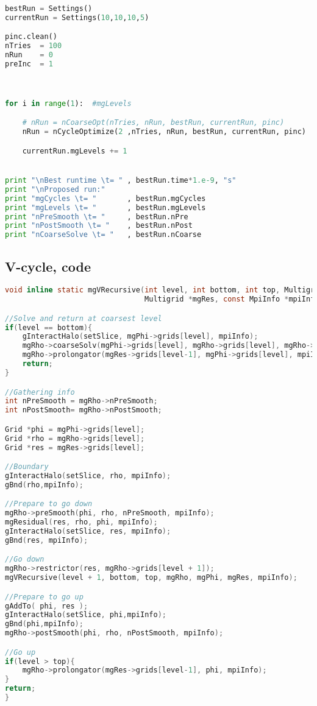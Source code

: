 \begin{lstlisting}[language=python, caption = Optimizer script]
bestRun = Settings()
currentRun = Settings(10,10,10,5)

pinc.clean()
nTries 	= 100
nRun	= 0
preInc 	= 1



for i in range(1):	#mgLevels

	# nRun = nCoarseOpt(nTries, nRun, bestRun, currentRun, pinc)
	nRun = nCycleOptimize(2 ,nTries, nRun, bestRun, currentRun, pinc)

	currentRun.mgLevels += 1


print "\nBest runtime \t= "	, bestRun.time*1.e-9, "s"
print "\nProposed run:"
print "mgCycles \t= "		, bestRun.mgCycles
print "mgLevels \t= "		, bestRun.mgLevels
print "nPreSmooth \t= "		, bestRun.nPre
print "nPostSmooth \t= "	, bestRun.nPost
print "nCoarseSolve \t= "	, bestRun.nCoarse

\end{lstlisting}

\subsection{V-cycle, code}
\label{sec:mg_V}
\begin{lstlisting}[language=c, caption = Implementation of an recursive V-cycle]
void inline static mgVRecursive(int level, int bottom, int top, Multigrid *mgRho, Multigrid *mgPhi,
								Multigrid *mgRes, const MpiInfo *mpiInfo){

//Solve and return at coarsest level
if(level == bottom){
	gInteractHalo(setSlice, mgPhi->grids[level], mpiInfo);
	mgRho->coarseSolv(mgPhi->grids[level], mgRho->grids[level], mgRho->nCoarseSolve, mpiInfo);
	mgRho->prolongator(mgRes->grids[level-1], mgPhi->grids[level], mpiInfo);
	return;
}

//Gathering info
int nPreSmooth = mgRho->nPreSmooth;
int nPostSmooth= mgRho->nPostSmooth;

Grid *phi = mgPhi->grids[level];
Grid *rho = mgRho->grids[level];
Grid *res = mgRes->grids[level];

//Boundary
gInteractHalo(setSlice, rho, mpiInfo);
gBnd(rho,mpiInfo);

//Prepare to go down
mgRho->preSmooth(phi, rho, nPreSmooth, mpiInfo);
mgResidual(res, rho, phi, mpiInfo);
gInteractHalo(setSlice, res, mpiInfo);
gBnd(res, mpiInfo);

//Go down
mgRho->restrictor(res, mgRho->grids[level + 1]);
mgVRecursive(level + 1, bottom, top, mgRho, mgPhi, mgRes, mpiInfo);

//Prepare to go up
gAddTo( phi, res );
gInteractHalo(setSlice, phi,mpiInfo);
gBnd(phi,mpiInfo);
mgRho->postSmooth(phi, rho, nPostSmooth, mpiInfo);

//Go up
if(level > top){
	mgRho->prolongator(mgRes->grids[level-1], phi, mpiInfo);
}
return;
}
\end{lstlisting}
